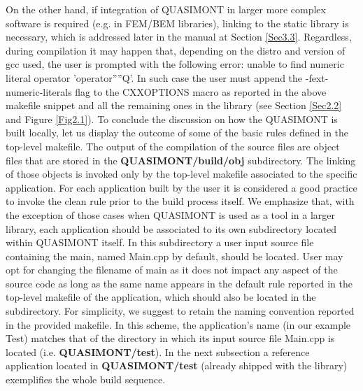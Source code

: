 \documentclass[a4paper, twosided]{book}
\begin{document}
\noindent
On the other hand, if integration of QUASIMONT in larger more complex software is required (e.g. in FEM/BEM libraries), linking to the static library is necessary, which is addressed later in the manual at Section \ref{Sec3.3}. Regardless, during compilation it may happen that, depending on the distro and version of \colorbox{poliGrayBlue}{gcc} used, the user is prompted with the following \colorbox{poliGrayBlue}{error: unable to find numeric literal operator 'operator''''Q'}. In such case the user must append the \colorbox{poliGrayBlue}{-fext-numeric-literals} flag to the \colorbox{poliGrayBlue}{CXXOPTIONS} macro as reported in the above \colorbox{poliGrayBlue}{makefile} snippet and all the remaining ones in the library (see Section \ref{Sec2.2} and Figure \ref{Fig2.1}). To conclude the discussion on how the QUASIMONT is built locally, let us display the outcome of some of the basic rules defined in the top-level \colorbox{poliGrayBlue}{makefile}. The output of the compilation of the source files are object files that are stored in the \colorbox{poliGrayBlue}{\textbf{QUASIMONT/build/obj}} subdirectory. The linking of those objects is invoked only by the top-level makefile associated to the specific application. For each application built by the user it is considered a good practice to invoke the \colorbox{poliGrayBlue}{clean} rule prior to the build process itself. We emphasize that, with the exception of those cases when QUASIMONT is used as a tool in a larger library, each application should be associated to its own subdirectory located within QUASIMONT itself. In this subdirectory a user input source file containing the \colorbox{poliGrayBlue}{main}, named \colorbox{poliGrayBlue}{Main.cpp} by default, should be located. User may opt for changing the filename of \colorbox{poliGrayBlue}{main} as it does not impact any aspect of the source code as long as the same name appears in the \colorbox{poliGrayBlue}{default} rule reported in the top-level \colorbox{poliGrayBlue}{makefile} of the application, which should also be located in the subdirectory. For simplicity, we suggest to retain the naming convention reported in the provided \colorbox{poliGrayBlue}{makefile}. In this scheme, the application's name (in our example \colorbox{poliGrayBlue}{Test}) matches that of the directory in which its input source file \colorbox{poliGrayBlue}{Main.cpp} is located (i.e. \colorbox{poliGrayBlue}{\textbf{QUASIMONT/test}}). In the next subsection a reference application located in  \colorbox{poliGrayBlue}{\textbf{QUASIMONT/test}} (already shipped with the library) exemplifies the whole build sequence.
\end{document}
